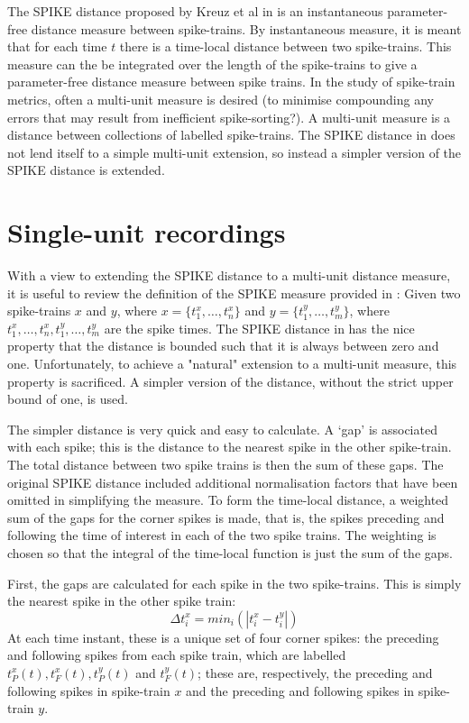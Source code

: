 The SPIKE distance proposed by Kreuz et al in \cite{Kreuzetal2011} is an instantaneous parameter-free distance measure between spike-trains.  By instantaneous measure, it is meant that for each time $t$ there is a time-local distance between two spike-trains.  This measure can the be integrated over the length of the spike-trains to give a parameter-free distance measure between spike trains. In the study of spike-train metrics, often a multi-unit measure is desired (to minimise compounding any errors that may result from inefficient spike-sorting?). A multi-unit measure is a distance between collections of labelled spike-trains.  The SPIKE distance in \cite{Kreuzetal2011} does not lend itself to a simple multi-unit extension, so instead a simpler version of the SPIKE distance is extended.

\section{Single-unit recordings}
With a view to extending the SPIKE distance to a multi-unit distance measure, it is useful to review the definition of the SPIKE measure provided in \cite{Kreuzetal2011}:  Given two spike-trains $x$ and $y$, where $x = \{ t_1^x, \ldots, t_n^x \}$ and $y = \{ t_1^y, \ldots , t_m^y\}$, where $t_1^x,\ldots,t_n^x,t_1^y,\ldots,t_m^y$ are the spike times.  The SPIKE distance in \cite{Kreuzetal2011} has the nice property that the distance is bounded such that it is always between zero and one.  Unfortunately, to achieve a "natural" extension to a multi-unit measure, this property is sacrificed.  A simpler version of the distance, without the strict upper bound of one, is used.

The simpler distance is very quick and easy to calculate.  A `gap' is associated with each spike; this is the distance to the nearest spike in the other spike-train.  The total distance between two spike trains is then the sum of these gaps.  The original SPIKE distance included additional normalisation factors that have been omitted in simplifying the measure.  To form the time-local distance, a weighted sum of the gaps for the corner spikes is made, that is, the spikes preceding and following the time of interest in each of the two spike trains.  The weighting is chosen so that the integral of the time-local function is just the sum of the gaps.

First, the gaps are calculated for each spike in the two spike-trains.  This is simply the nearest spike in the other spike train:
\begin{equation}
\Delta t_i^x = min_i ( | t_i^x - t_i^y |)
\end{equation}
At each time instant, these is a unique set of four corner spikes: the preceding and following spikes from each spike train, which are labelled $t_P^x(t), t_F^x(t), t_P^y(t)$ and  $t_F^y(t)$; these are, respectively, the preceding and following spikes in spike-train $x$ and the preceding and following spikes in spike-train $y$.

